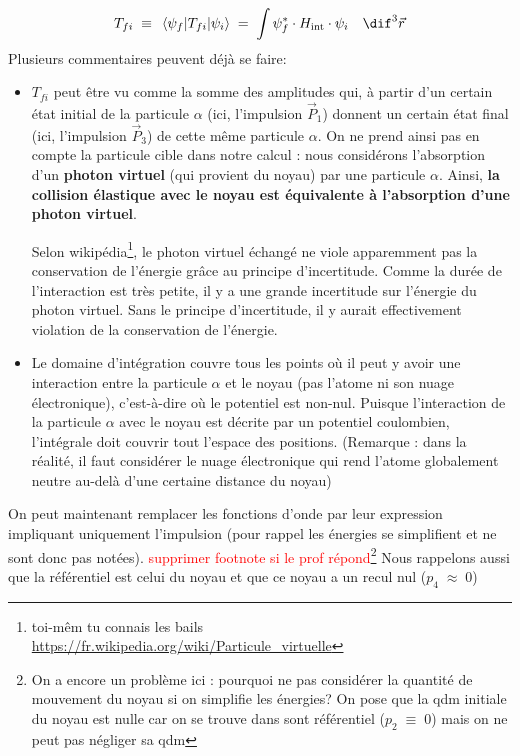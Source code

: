 \[
    T_{fi} 
    \; \equiv \;
    \mel{\psi_f}{T_{fi}}{\psi_i}
    \eq
    \int \psi_f^* \cdot H_\text{int} \cdot \psi_i \quad \dif^3\vec{r}
\]
Plusieurs commentaires peuvent déjà se faire:
\begin{itemize}

    \item $T_{fi}$ peut être vu comme la somme des amplitudes qui, à partir d'un certain état initial de la particule $\alpha$ (ici, l'impulsion $\vec{P}_1$) donnent un certain état final (ici, l'impulsion $\vec{P}_3$) de cette même particule $\alpha$. On ne prend ainsi pas en compte la particule cible dans notre calcul : nous considérons l'absorption d'un \textbf{photon virtuel} (qui provient du noyau) par une particule $\alpha$. Ainsi, \textbf{la collision élastique avec le noyau est équivalente à l'absorption d'une photon virtuel}.
     
    Selon wikipédia\footnote{toi-mêm tu connais les bails \url{https://fr.wikipedia.org/wiki/Particule_virtuelle}}, le photon virtuel échangé ne viole apparemment pas la conservation de l'énergie grâce au principe d'incertitude. Comme la durée de l'interaction est très petite, il y a une grande incertitude sur l'énergie du photon virtuel. Sans le principe d'incertitude, il y aurait effectivement violation de la conservation de l'énergie.
    
    \item Le domaine d'intégration couvre tous les points où il peut y avoir une interaction entre la particule $\alpha$ et le noyau (pas l'atome ni son nuage électronique), c'est-à-dire où le potentiel est non-nul. Puisque l'interaction de la particule $\alpha$ avec le noyau est décrite par un potentiel coulombien, l'intégrale doit couvrir tout l'espace des positions. (Remarque : dans la réalité, il faut considérer le nuage électronique qui rend l'atome globalement neutre au-delà d'une certaine distance du noyau)
    
\end{itemize}
On peut maintenant remplacer les fonctions d'onde par leur expression impliquant uniquement l'impulsion (pour rappel les énergies se simplifient et ne sont donc pas notées). \textcolor{red}{supprimer footnote si le prof répond}\footnote{On a encore un problème ici : pourquoi ne pas considérer la quantité de mouvement du noyau si on simplifie les énergies? On pose que la qdm initiale du noyau est nulle car on se trouve dans sont référentiel ($p_2\;\equiv\;0$) mais on ne peut pas négliger sa qdm}
Nous rappelons aussi que la référentiel est celui du noyau  et que ce noyau a un recul nul ($p_4\;\approx\;0$)

